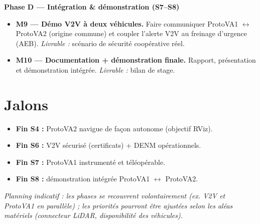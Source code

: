\documentclass[a4paper,10pt]{article}
\begin{document}
\textbf{\textcolor{cCons}{Phase D --- Intégration \& démonstration (S7--S8)}}
\begin{itemize}[leftmargin=1.4em, itemsep=1pt]
\item \textbf{M9 --- Démo V2V à deux véhicules.} Faire communiquer
      ProtoVA1 $\leftrightarrow$ ProtoVA2 (origine commune) et coupler l'alerte
      V2V au freinage d'urgence (AEB). \emph{Livrable :} scénario de sécurité
      coopérative réel.
\item \textbf{M10 --- Documentation + démonstration finale.} Rapport, présentation
      et démonstration intégrée. \emph{Livrable :} bilan de stage.
\end{itemize}

\section*{\textcolor{primary}{Jalons}}
\begin{itemize}[leftmargin=1.4em, itemsep=1pt]
\item \textbf{Fin S4 :} ProtoVA2 navigue de façon autonome (objectif RViz).
\item \textbf{Fin S6 :} V2V sécurisé (certificats) + DENM opérationnels.
\item \textbf{Fin S7 :} ProtoVA1 instrumenté et téléopérable.
\item \textbf{Fin S8 :} démonstration intégrée ProtoVA1 $\leftrightarrow$ ProtoVA2.
\end{itemize}

\vspace{4pt}
{\footnotesize\itshape Planning indicatif : les phases se recouvrent volontairement
(ex. V2V et ProtoVA1 en parallèle) ; les priorités pourront être ajustées selon les
aléas matériels (connecteur LiDAR, disponibilité des véhicules).}
\end{document}
